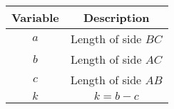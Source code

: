 \begin{tabular}[15pt]{ |c| c|}
    \hline
    \textbf{Variable} & \textbf{Description}\\ 
    \hline
    $a$ & Length of side $BC$ \\
    \hline 
    $b$ & Length of side $AC$ \\
	\hline
    $c$ & Length of side $AB$ \\
    \hline
	$k$ & $k=b-c$ \\
	\hline
    \end{tabular}
